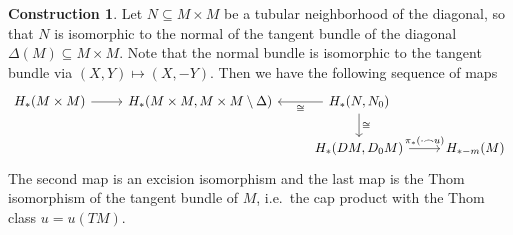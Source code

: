 \documentclass{scrartcl}
\theoremstyle{plain}
\theoremstyle{definition}
\newtheorem{construction}[theorem]{Construction}
\renewcommand{\subset}{\subseteq}
\newcommand{\capp}{\mathbin{\frown}}
\newcommand{\iso}{\cong}
\begin{document}
\begin{construction}
Let $N\subset M\times M$ be a tubular neighborhood of the diagonal, so that $N$ is isomorphic to the normal of the tangent bundle of the diagonal $\Delta(M)\subset M\times M$. Note that the normal bundle is isomorphic to the tangent bundle via $(X, Y)\mapsto (X, -Y)$. Then we have the following sequence of maps
\begin{equation}
\begin{tikzcd}
    H_*(M\times M) \rar & H_*(M\times M, M\times M\setminus \Delta) & \lar["\iso"] H_*(N, N_0) \dar["\iso"] &\ \\
    & & H_*(DM, D_0M) \rar["\pi_*(\cdot \capp u)"] & H_{*-m}(M)
\end{tikzcd}
\end{equation}
The second map is an excision isomorphism and the last map is the Thom isomorphism of the tangent bundle of $M$, i.e.\ the cap product with the Thom class $u=u(TM)$. 
\end{construction}
\end{document}
